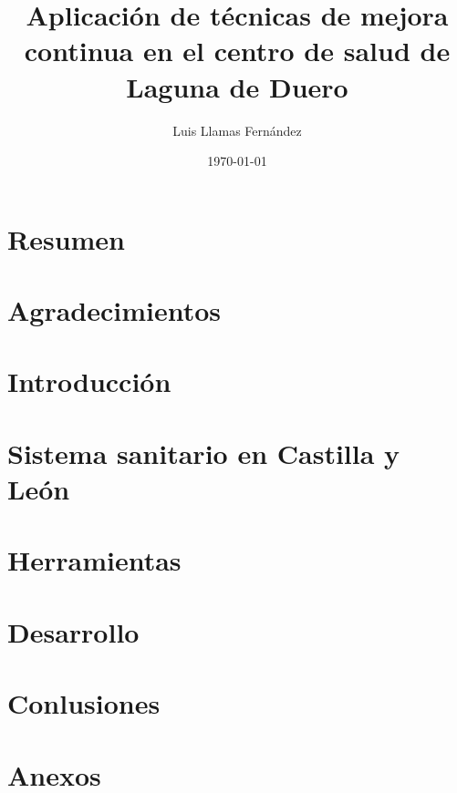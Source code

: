 \documentclass[12pt, a4paper]{report}
\begin{document}
\title{Aplicación de técnicas de mejora continua en el centro de salud de Laguna de Duero}
\author{Luis Llamas Fernández}
\date{\today}
\maketitle

\chapter*{Resumen}
\chapter*{Agradecimientos}

\tableofcontents

\chapter{Introducción}


\chapter{Sistema sanitario en Castilla y León}


\chapter{Herramientas}
\chapter{Desarrollo}
\chapter{Conlusiones}

\appendix
\chapter{Anexos}

\end{document}
